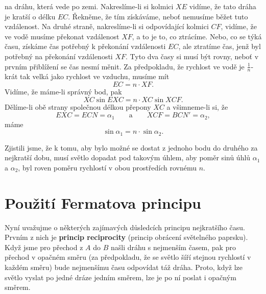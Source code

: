 {    na dráhu, která vede po zemi. Nakreslíme-li si kolmici \(XE\) vidíme, že tato dráha je kratší o 
    délku \(EC\). Řekněme, že tím získáváme, neboť nemusíme běžet tuto vzdálenost. Na druhé straně, 
    nakreslíme-li si odpovídající kolmici \(CF\), vidíme, že ve vodě musíme překonat vzdálenost 
    \(XF\), a to je to, co ztrácíme. Nebo, co se týká času, získáme čas potřebný k překonání 
    vzdálenosti \(EC\), ale ztratíme čas, jenž byl potřebný na překonání vzdálenosti \(XF\). Tyto 
    dva časy si musí být rovny, neboť v prvním přiblížení se čas nesmí měnit. Za předpokladu, že 
    rychlost ve vodě je \(\frac{1}{n}\)-krát tak velká jako rychlost ve vzduchu, musíme mít
    \begin{equation}\label{fyz:eq355}
      EC = n\cdot XF.
    \end{equation}
    Vidíme, že máme-li správný bod, pak
    \begin{equation*}
      XC\sin EXC = n\cdot XC\sin XCF.
    \end{equation*}
    Dělíme-li obě strany společnou délkou přepony \(XC\) a všimneme-li si, že
    \begin{equation*}
      EXC = ECN = \alpha_1 \qquad \text{a} \qquad XCF = BCN' = \alpha_2,
    \end{equation*}
    máme
    \begin{equation}\label{fyz:eq356}
      \sin\alpha_1 = n\cdot\sin\alpha_2.
    \end{equation}
    
    Zjistili jsme, že k tomu, aby bylo možné se dostat z jednoho bodu do druhého za nejkratší dobu, 
    musí světlo dopadat pod takovým úhlem, aby poměr sinů úhlů \(\alpha_1\) a \(\alpha_2\), byl 
    roven poměru rychlostí v obou prostředích rovnému \(n\).

  \section{Použití Fermatova principu}\label{fyz:IchapXXVIsecIV}
    Nyní uvažujme o některých zajímavých důsledcích principu nejkratšího času. Prvním z nich je 
    \textbf{princip reciprocity} (princip obrácení světelného paprsku). Když jsme pro přechod z 
    \(A\) do \(B\) našli dráhu s nejmenším časem, pak pro přechod v opačném směru (za předpokladu, 
    že se světlo šíří stejnou rychlostí v každém směru) bude nejmenšímu času odpovídat táž dráha. 
    Proto, když lze světlo vyslat po jedné dráze jedním směrem, lze je po ní poslat i opačným 
    směrem.
    
}
